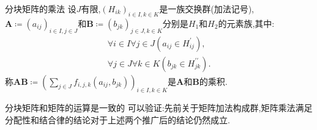 \begin{definition}{分块矩阵的乘法}{}
	设$J$有限,$\left(H_{ik}\right)_{i\in I,k\in K}$是一族交换群(加法记号),$\boldsymbol{A}\coloneq\left(a_{ij}\right)_{i\in I,j\in J}$和$\boldsymbol{B}\coloneq\left(b_{jk}\right)_{j\in J,k\in K}$分别是$H_{1}$和$H_{2}$的元素族,其中:
	\begin{gather*}
		\forall i\in I\forall j\in J\left(a_{ij}\in H_{ij}^{\prime}\right),\\
		\forall j\in J\forall k\in K\left(b_{jk}\in H_{jk}^{\prime\prime}\right).
	\end{gather*}
	称$\boldsymbol{A}\boldsymbol{B}\coloneq\left(\sum\limits_{j\in J}f_{i,j,k}\left(a_{ij},b_{jk}\right)\right)_{i\in I,k\in K}$是$\boldsymbol{A}$和$\boldsymbol{B}$的乘积.
\end{definition}

\begin{remark}{分块矩阵和矩阵的运算是一致的}{}
	可以验证:先前关于矩阵加法构成群,矩阵乘法满足分配性和结合律的结论对于上述两个推广后的结论仍然成立.
\end{remark}

